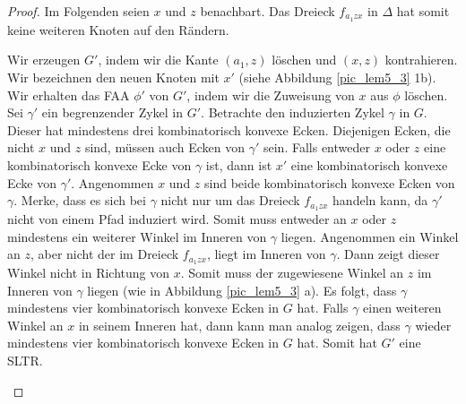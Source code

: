 \begin{proof}
Im Folgenden seien $x$ und $z$ benachbart. Das Dreieck $f_{a_1zx}$ in $\Delta$ hat somit keine weiteren Knoten auf den Rändern.
\begin{description}[leftmargin =0pt, font = \rmfamily ,listparindent=\parindent,parsep=0pt]
\item[Fall 1a:] Wir erzeugen $G'$, indem wir die Kante $(a_1,z)$ löschen und $(x,z)$ kontrahieren. Wir bezeichnen den neuen Knoten mit $x'$ (siehe Abbildung \ref{pic_lem5_3} 1b). Wir erhalten das FAA $\phi'$ von $G'$, indem wir die Zuweisung von $x$ aus $\phi$ löschen. Sei $\gamma'$ ein begrenzender Zykel in $G'$. Betrachte den induzierten Zykel $\gamma$ in $G$. Dieser hat mindestens drei kombinatorisch konvexe Ecken. Diejenigen Ecken, die nicht $x$ und $z$ sind, müssen auch Ecken von $\gamma'$ sein. Falls entweder $x$ oder $z$ eine kombinatorisch konvexe Ecke von $\gamma$ ist, dann ist $x'$ eine kombinatorisch konvexe Ecke von $\gamma'$. Angenommen $x$ und $z$ sind beide kombinatorisch konvexe Ecken von $\gamma$. Merke, dass es sich bei $\gamma$ nicht nur um das Dreieck $f_{a_1zx}$ handeln kann, da $\gamma'$ nicht von einem Pfad induziert wird. Somit muss entweder an $x$ oder $z$ mindestens ein weiterer Winkel im Inneren von $\gamma$ liegen. Angenommen ein Winkel an $z$, aber nicht der im Dreieck $f_{a_1zx}$, liegt im Inneren von $\gamma$. Dann zeigt dieser Winkel nicht in Richtung von $x$. Somit muss der zugewiesene Winkel an $z$ im Inneren von $\gamma$ liegen (wie in Abbildung \ref{pic_lem5_3} a). Es folgt, dass $\gamma$ mindestens vier kombinatorisch konvexe Ecken in $G$ hat. Falls $\gamma$ einen weiteren Winkel an $x$ in seinem Inneren hat, dann kann man analog zeigen, dass $\gamma$ wieder mindestens vier kombinatorisch konvexe Ecken in $G$ hat. Somit hat $G'$ eine SLTR.


\end{description}
\end{proof}

